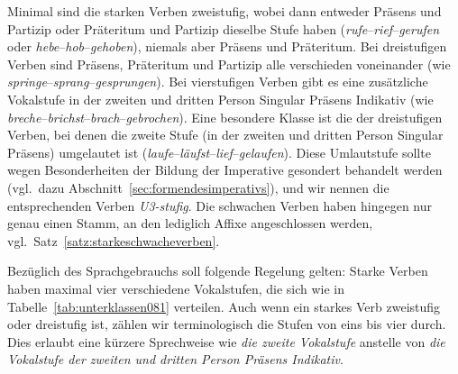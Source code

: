Minimal sind die starken Verben zweistufig, wobei dann entweder Präsens und Partizip oder Präteritum und Partizip dieselbe Stufe haben (\textit{rufe}--\textit{rief}--\textit{gerufen} oder \textit{hebe}--\textit{hob}--\textit{gehoben}), niemals aber Präsens und Präteritum.
Bei dreistufigen Verben sind Präsens, Präteritum und Partizip alle verschieden voneinander (wie \textit{springe}--\textit{sprang}--\textit{gesprungen}).
Bei vierstufigen Verben gibt es eine zusätzliche Vokalstufe in der zweiten und dritten Person Singular Präsens Indikativ (wie \textit{breche}--\textit{brichst}--\textit{brach}--\textit{gebrochen}).
Eine besondere Klasse ist die der dreistufigen Verben, bei denen die zweite Stufe (in der zweiten und dritten Person Singular Präsens) umgelautet ist (\textit{laufe}--\textit{läufst}--\textit{lief}--\textit{gelaufen}).
Diese Umlautstufe sollte wegen Besonderheiten der Bildung der Imperative gesondert behandelt werden (vgl.\ dazu Abschnitt~\ref{sec:formendesimperativs}), und wir nennen die entsprechenden Verben \textit{U3-stufig}.
Die schwachen Verben haben hingegen nur genau einen Stamm, an den lediglich Affixe angeschlossen werden, vgl.\ Satz~\ref{satz:starkeschwacheverben}.



Bezüglich des Sprachgebrauchs soll folgende Regelung gelten:
Starke Verben haben maximal vier verschiedene Vokalstufen, die sich wie in Tabelle~\ref{tab:unterklassen081} verteilen.
Auch wenn ein starkes Verb zweistufig oder dreistufig ist, zählen wir terminologisch die Stufen von eins bis vier durch.
Dies erlaubt eine kürzere Sprechweise wie \textit{die zweite Vokalstufe} anstelle von \textit{die Vokalstufe der zweiten und dritten Person Präsens Indikativ}.

